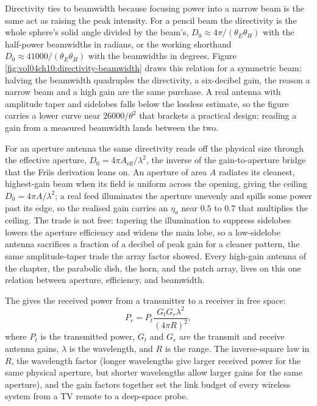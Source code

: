 Directivity ties to beamwidth because focusing power into a narrow beam is
the same act as raising the peak intensity. For a pencil beam the
directivity is the whole sphere's solid angle divided by the beam's,
$D_0\approx 4\pi/(\theta_E\theta_H)$ with the half-power beamwidths in
radians, or the working shorthand $D_0\approx 41000/(\theta_E\theta_H)$
with the beamwidths in degrees. Figure
\ref{fig:vol04ch10:directivity-beamwidth} draws this relation for a
symmetric beam: halving the beamwidth quadruples the directivity, a
six-decibel gain, the reason a narrow beam and a high gain are the same
purchase. A real antenna with amplitude taper and sidelobes falls below the
lossless estimate, so the figure carries a lower curve near $26000/
\theta^2$ that brackets a practical design; reading a gain from a measured
beamwidth lands between the two.



For an aperture antenna the same directivity reads off the physical size
through the effective aperture, $D_0 = 4\pi A_{\text{eff}}/\lambda^2$, the
inverse of the gain-to-aperture bridge that the Friis derivation leans on.
An aperture of area $A$ radiates its cleanest, highest-gain beam when its
field is uniform across the opening, giving the ceiling $D_0 = 4\pi
A/\lambda^2$; a real feed illuminates the aperture unevenly and spills some
power past its edge, so the realised gain carries an  $\eta_a$ near $0.5$ to $0.7$ that multiplies the ceiling. The
trade is not free: tapering the illumination to suppress sidelobes lowers
the aperture efficiency and widens the main lobe, so a low-sidelobe antenna
sacrifices a fraction of a decibel of peak gain for a cleaner pattern, the
same amplitude-taper trade the array factor showed. Every high-gain antenna
of the chapter, the parabolic dish, the horn, and the patch array, lives on
this one relation between aperture, efficiency, and beamwidth.

The  gives the received power
from a transmitter to a receiver in free space:
\[
P_{r} = P_{t}\frac{G_{t} G_{r} \lambda^{2}}{(4\pi R)^{2}},
\]
where $P_{t}$ is the transmitted power, $G_{t}$ and $G_{r}$ are the
transmit and receive antenna gains, $\lambda$ is the wavelength, and
$R$ is the range. The inverse-square law in $R$, the wavelength
factor (longer wavelengths give larger received power for the same
physical aperture, but shorter wavelengths allow larger gains for
the same aperture), and the gain factors together set the link
budget of every wireless system from a TV remote to a deep-space
probe.

